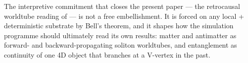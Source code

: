 The interpretive commitment that closes the present paper --- the retrocausal worldtube reading of  --- is not a free embellishment.
It is forced on any local + deterministic substrate by Bell's theorem, and it shapes how the simulation programme should ultimately read its own results: matter and antimatter as forward- and backward-propagating soliton worldtubes, and entanglement as continuity of one 4D object that branches at a V-vertex in the past.

